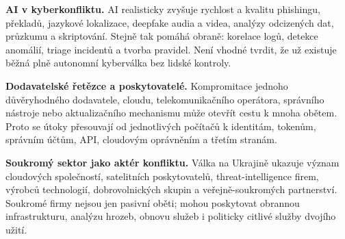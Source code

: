 
\textbf{AI v kyberkonfliktu.} AI realisticky zvyšuje rychlost a kvalitu phishingu, překladů, jazykové lokalizace, deepfake audia a videa, analýzy odcizených dat, průzkumu a skriptování. Stejně tak pomáhá obraně: korelace logů, detekce anomálií, triage incidentů a tvorba pravidel. Není vhodné tvrdit, že už existuje běžná plně autonomní kyberválka bez lidské kontroly.

\textbf{Dodavatelské řetězce a poskytovatelé.} Kompromitace jednoho důvěryhodného dodavatele, cloudu, telekomunikačního operátora, správního nástroje nebo aktualizačního mechanismu může otevřít cestu k mnoha obětem. Proto se útoky přesouvají od jednotlivých počítačů k identitám, tokenům, správním účtům, API, cloudovým oprávněním a třetím stranám.

\textbf{Soukromý sektor jako aktér konfliktu.} Válka na Ukrajině ukazuje význam cloudových společností, satelitních poskytovatelů, threat-intelligence firem, výrobců technologií, dobrovolnických skupin a veřejně-soukromých partnerství. Soukromé firmy nejsou jen pasivní oběti; mohou poskytovat obrannou infrastrukturu, analýzu hrozeb, obnovu služeb i politicky citlivé služby dvojího užití.

